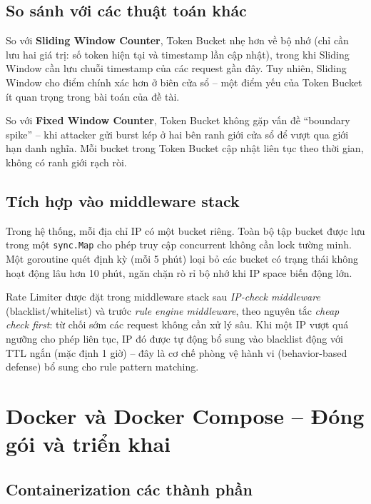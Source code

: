 \documentclass[../DoAn.tex]{subfiles}
\begin{document}
\subsection{So sánh với các thuật toán khác}
\label{subsection:3.7.2}

So với \textbf{Sliding Window Counter}, Token Bucket nhẹ hơn về bộ nhớ
(chỉ cần lưu hai giá trị: số token hiện tại và timestamp lần cập nhật),
trong khi Sliding Window cần lưu chuỗi timestamp của các request gần đây.
Tuy nhiên, Sliding Window cho điểm chính xác hơn ở biên cửa sổ -- một điểm
yếu của Token Bucket ít quan trọng trong bài toán của đề tài.

So với \textbf{Fixed Window Counter}, Token Bucket không gặp vấn đề
``boundary spike'' -- khi attacker gửi burst kép ở hai bên ranh giới cửa sổ
để vượt qua giới hạn danh nghĩa. Mỗi bucket trong Token Bucket cập nhật
liên tục theo thời gian, không có ranh giới rạch ròi.

\subsection{Tích hợp vào middleware stack}
\label{subsection:3.7.3}

Trong hệ thống, mỗi địa chỉ IP có một bucket riêng. Toàn bộ tập bucket được
lưu trong một \texttt{sync.Map} cho phép truy cập concurrent không cần lock
tường minh. Một goroutine quét định kỳ (mỗi 5 phút) loại bỏ các bucket có
trạng thái không hoạt động lâu hơn 10 phút, ngăn chặn rò rỉ bộ nhớ khi
IP space biến động lớn.

Rate Limiter được đặt trong middleware stack sau \textit{IP-check middleware}
(blacklist/whitelist) và trước \textit{rule engine middleware}, theo nguyên
tắc \textit{cheap check first}: từ chối sớm các request không cần xử lý sâu.
Khi một IP vượt quá ngưỡng cho phép liên tục, IP đó được tự động bổ sung
vào blacklist động với TTL ngắn (mặc định 1 giờ) -- đây là cơ chế phòng vệ
hành vi (behavior-based defense) bổ sung cho rule pattern matching.

\section{Docker và Docker Compose -- Đóng gói và triển khai}
\label{section:3.8}

\subsection{Containerization các thành phần}
\label{subsection:3.8.1}
\end{document}
